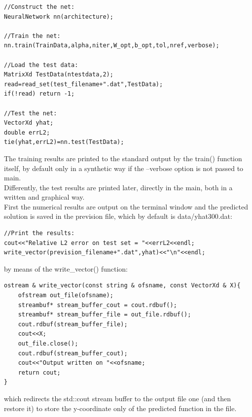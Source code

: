 \documentclass[12pt, a4paper]{report}
\theoremstyle{definition}
\begin{document}
\begin{lstlisting}[frame=single]
//Construct the net:
NeuralNetwork nn(architecture);

//Train the net:
nn.train(TrainData,alpha,niter,W_opt,b_opt,tol,nref,verbose);

//Load the test data:
MatrixXd TestData(ntestdata,2);
read=read_set(test_filename+".dat",TestData);
if(!read) return -1;

//Test the net:
VectorXd yhat;
double errL2;
tie(yhat,errL2)=nn.test(TestData);
\end{lstlisting}
The training results are printed to the standard output by the {\ttfamily train()} function itself, by default only in a synthetic way if the {\ttfamily --verbose} option is not passed to main. \\
Differently, the test results are printed later, directly in the main, both in a written and graphical way. \\
First the numerical results are output on the terminal window and the predicted solution is saved in the prevision file, which by default is data/yhat300.dat:
\begin{lstlisting}[frame=single, showstringspaces=false]
//Print the results:
cout<<"Relative L2 error on test set = "<<errL2<<endl;
write_vector(prevision_filename+".dat",yhat)<<"\n"<<endl;
\end{lstlisting}
by means of the {\ttfamily write\_vector()} function:
\begin{lstlisting}[frame=single, showstringspaces=false]
ostream & write_vector(const string & ofsname, const VectorXd & X){
	ofstream out_file(ofsname);
	streambuf* stream_buffer_cout = cout.rdbuf();
	streambuf* stream_buffer_file = out_file.rdbuf();
	cout.rdbuf(stream_buffer_file);
	cout<<X;
	out_file.close();
	cout.rdbuf(stream_buffer_cout);
	cout<<"Output written on "<<ofsname;
	return cout;
} 
\end{lstlisting}
which redirects the {\ttfamily std::cout} stream buffer to the output file one (and then restore it) to store the y-coordinate only of the predicted function in the file.\\ 
\end{document}
